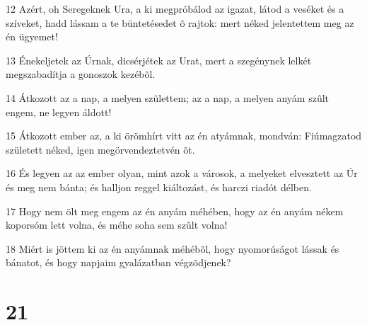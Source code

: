 \par 12 Azért, oh Seregeknek Ura, a ki megpróbálod az igazat, látod a veséket és a szíveket, hadd lássam a te büntetésedet õ rajtok: mert néked jelentettem meg az én ügyemet!
\par 13 Énekeljetek az Úrnak, dicsérjétek az Urat, mert a szegénynek lelkét megszabadítja a gonoszok kezébõl.
\par 14 Átkozott az a nap, a melyen születtem; az a nap, a melyen anyám szûlt engem, ne legyen áldott!
\par 15 Átkozott ember az, a ki örömhírt vitt az én atyámnak, mondván: Fiúmagzatod született néked, igen megörvendeztetvén õt.
\par 16 És legyen az az ember olyan, mint azok a városok, a melyeket elvesztett az Úr és meg nem bánta; és halljon reggel kiáltozást, és harczi riadót délben.
\par 17 Hogy nem ölt meg engem az én anyám méhében, hogy az én anyám nékem koporsóm lett volna, és méhe soha sem szûlt volna!
\par 18 Miért is jöttem ki az én anyámnak méhébõl, hogy nyomorúságot lássak és bánatot, és hogy napjaim gyalázatban végzõdjenek?

\chapter{21}

